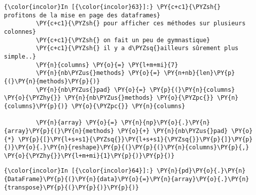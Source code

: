     \begin{Verbatim}[commandchars=\\\{\},frame=single,framerule=0.3mm,rulecolor=\color{cellframecolor}]
{\color{incolor}In [{\color{incolor}63}]:} \PY{c+c1}{\PYZsh{} profitons de la mise en page des dataframes}
         \PY{c+c1}{\PYZsh{} pour afficher ces méthodes sur plusieurs colonnes}
         \PY{c+c1}{\PYZsh{} on fait un peu de gymnastique}
         \PY{c+c1}{\PYZsh{} il y a d\PYZsq{}ailleurs sûrement plus simple..}
         \PY{n}{columns} \PY{o}{=} \PY{l+m+mi}{7}
         \PY{n}{nb\PYZus{}methods} \PY{o}{=} \PY{n+nb}{len}\PY{p}{(}\PY{n}{methods}\PY{p}{)}
         \PY{n}{nb\PYZus{}pad} \PY{o}{=} \PY{p}{(}\PY{n}{columns} \PY{o}{\PYZhy{}} \PY{n}{nb\PYZus{}methods} \PY{o}{\PYZpc{}} \PY{n}{columns}\PY{p}{)} \PY{o}{\PYZpc{}} \PY{n}{columns}
         
         \PY{n}{array} \PY{o}{=} \PY{n}{np}\PY{o}{.}\PY{n}{array}\PY{p}{(}\PY{n}{methods} \PY{o}{+} \PY{n}{nb\PYZus{}pad} \PY{o}{*} \PY{p}{[}\PY{l+s+s1}{\PYZsq{}}\PY{l+s+s1}{\PYZsq{}}\PY{p}{]}\PY{p}{)}\PY{o}{.}\PY{n}{reshape}\PY{p}{(}\PY{p}{(}\PY{n}{columns}\PY{p}{,} \PY{o}{\PYZhy{}}\PY{l+m+mi}{1}\PY{p}{)}\PY{p}{)}
\end{Verbatim}


    \begin{Verbatim}[commandchars=\\\{\},frame=single,framerule=0.3mm,rulecolor=\color{cellframecolor}]
{\color{incolor}In [{\color{incolor}64}]:} \PY{n}{pd}\PY{o}{.}\PY{n}{DataFrame}\PY{p}{(}\PY{n}{data}\PY{o}{=}\PY{n}{array}\PY{o}{.}\PY{n}{transpose}\PY{p}{(}\PY{p}{)}\PY{p}{)}
\end{Verbatim}


